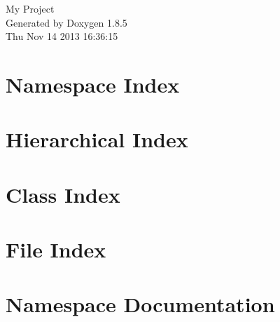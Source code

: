 \documentclass[twoside]{book}
\newcommand{\clearemptydoublepage}{%
  \newpage{\pagestyle{empty}\cleardoublepage}%
}
\begin{document}
\hypersetup{pageanchor=false}
\begin{titlepage}
\vspace*{7cm}
\begin{center}%
{\Large My Project }\\
\vspace*{1cm}
{\large Generated by Doxygen 1.8.5}\\
\vspace*{0.5cm}
{\small Thu Nov 14 2013 16:36:15}\\
\end{center}
\end{titlepage}
\clearemptydoublepage
\tableofcontents
\clearemptydoublepage
{}
\hypersetup{pageanchor=true}

\chapter{Namespace Index}

\chapter{Hierarchical Index}

\chapter{Class Index}

\chapter{File Index}

\chapter{Namespace Documentation}






\end{document}
